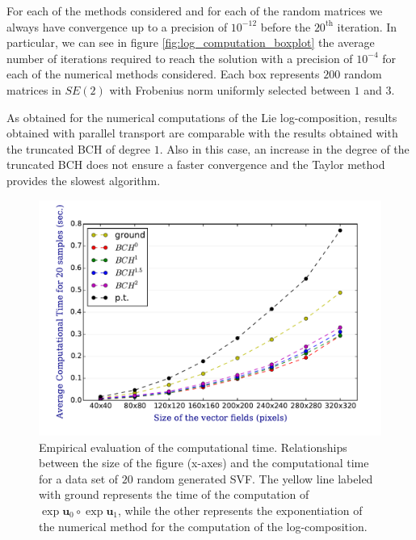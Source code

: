 For each of the methods considered and for each of the random matrices we always have convergence up to a precision of $10^{-12}$ before the $20^{\text{th}}$ iteration.
In particular, we can see in figure \ref{fig:log_computation_boxplot}  the average number of iterations required to reach the solution with a precision of $10^{-4}$ for each of the numerical methods considered. Each box represents $200$ random matrices in $SE(2)$ with Frobenius norm uniformly selected between $1$ and $3$.

As obtained for the numerical computations of the Lie log-composition, results obtained with parallel transport are comparable with the results obtained with the truncated BCH of degree $1$. Also in this case, an increase in the degree of the truncated BCH does not ensure a faster convergence and the Taylor method provides the slowest algorithm.

\begin{figure}[!ht]
	\centering
	\includegraphics[scale=0.6]{figures/svf_computational_time.pdf}
	\caption{Empirical evaluation of the computational time. Relationships between the size of the figure (x-axes) and the computational time for a data set of $20$ random generated SVF. The yellow line labeled with ground represents the time of the computation of $\exp{\mathbf{u}_0}\circ \exp{\mathbf{u}_1}$, while the other represents the exponentiation of the numerical method for the computation of the log-composition.}
	\label{fig:svf_computational_time}
\end{figure}

